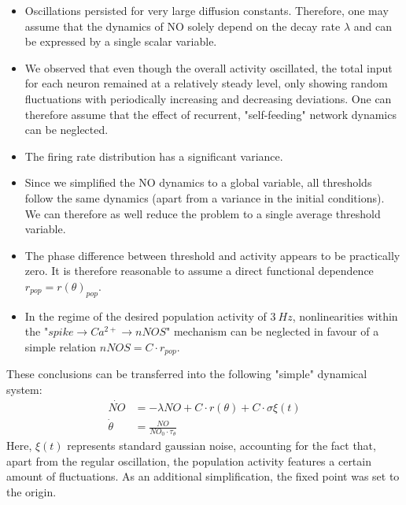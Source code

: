 \documentclass[10pt,a4paper]{article}
\begin{document}
\begin{itemize}
\item Oscillations persisted for very large diffusion constants. Therefore, one may assume that the dynamics of NO solely depend on the decay rate $\lambda$ and can be expressed by a single scalar variable.
\item We observed that even though the overall activity oscillated, the total input for each neuron remained at a relatively steady level, only showing random fluctuations with periodically increasing and decreasing deviations. One can therefore assume that the effect of recurrent, "self-feeding" network dynamics can be neglected.
\item The firing rate distribution has a significant variance.
\item Since we simplified the NO dynamics to a global variable, all thresholds follow the same dynamics (apart from a variance in the initial conditions). We can therefore as well reduce the problem to a single average threshold variable.
\item The phase difference between threshold and activity appears to be practically zero. It is therefore reasonable to assume a direct functional dependence $r_{pop}=r(\theta)_{pop}$.
\item In the regime of the desired population activity of $3~Hz$, nonlinearities within the "$spike \rightarrow Ca^{2+} \rightarrow nNOS$" mechanism can be neglected in favour of a simple relation $nNOS = C\cdot r_{pop}$.  
\end{itemize}

These conclusions can be transferred into the following "simple" dynamical system:
\begin{align}
\dot{NO} &= -\lambda NO + C\cdot r(\theta) + C\cdot \sigma \xi(t) \label{simple_NO_dyn}\\ 
\dot{\theta} &= \frac{NO}{NO_0\cdot \tau_{\theta}} \label{simple_threshold_dyn}
\end{align}
Here, $\xi(t)$ represents standard gaussian noise, accounting for the fact that, apart from the regular oscillation, the population activity features a certain amount of fluctuations. As an additional simplification, the fixed point was set to the origin.
\end{document}
